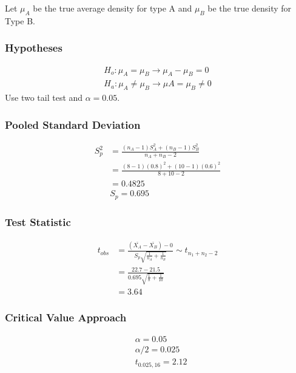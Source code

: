\documentclass{article}
\begin{document}
        Let $\mu_{A}$ be the true average density for type A and $\mu_{B}$
        be the true density for Type B.

        \subsubsection*{Hypotheses}
            \begin{align*}
                H_{o}: \mu_{A} = \mu_{B} \rightarrow \mu_{A} - \mu_{B} = 0\\
                H_{a}: \mu_{A} \neq \mu_{B}  \rightarrow \mu{A} = \mu_{B} \neq 0
            \end{align*}
            Use two tail test and $\alpha = 0.05$.

        \subsubsection*{Pooled Standard Deviation}
            \begin{align*}
                S_{p}^{2} &= \frac{ (n_{A} - 1)S_{A}^{2} + (n_{B} - 1) S_{B}^{2} }{n_{A} + n_{B} - 2}\\
                &=  \frac{ (8 - 1)(0.8)^{2} + (10 - 1) (0.6)^{2} }{8 + 10 - 2}\\
                &= 0.4825\\
                &S_{p} = 0.695
            \end{align*}
        \subsubsection*{Test Statistic}
             \begin{align*}
                t_{obs} &= \frac{(\bar{X_{A}} - \bar{X_{B}})-0}{S_{p} \sqrt{\frac{1}{n_{A}}+\frac{1}{n_{B}}}} \sim t_{n_{1}+n_{2}-2}\\
                &= \frac{22.7-21.5}{0.695 \sqrt{\frac{1}{8} +\frac{1}{10}}}\\
                &= 3.64
             \end{align*}
       \subsubsection*{Critical Value Approach} 
       \begin{align*}
        &\alpha = 0.05\\
        &\alpha/2 = 0.025\\
        &t_{0.025, 16} = 2.12\\
       \end{align*}
\end{document}
